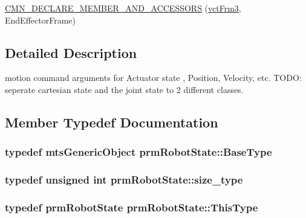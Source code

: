 {\bf }\par
\begin{DoxyCompactItemize}
\item 
\hyperlink{classprm_robot_state_a1c5c8244ace0caeb58700415253a892a}{C\+M\+N\+\_\+\+D\+E\+C\+L\+A\+R\+E\+\_\+\+M\+E\+M\+B\+E\+R\+\_\+\+A\+N\+D\+\_\+\+A\+C\+C\+E\+S\+S\+O\+R\+S} (\hyperlink{vct_transformation_types_8h_a81feda0a02c2d1bc26e5553f409fed20}{vct\+Frm3}, End\+Effector\+Frame)
\end{DoxyCompactItemize}



\subsection{Detailed Description}
motion command arguments for Actuator state , Position, Velocity, etc. T\+O\+D\+O\+: seperate cartesian state and the joint state to 2 different classes. 

\subsection{Member Typedef Documentation}
\hypertarget{classprm_robot_state_a602400b6ea7b54575290cc5207fc0167}{}
\subsubsection[{Base\+Type}]{\setlength{\rightskip}{0pt plus 5cm}typedef {\bf mts\+Generic\+Object} {\bf prm\+Robot\+State\+::\+Base\+Type}}\label{classprm_robot_state_a602400b6ea7b54575290cc5207fc0167}
\hypertarget{classprm_robot_state_a2cf2c739d5b3cdd3f9d44e2878183d90}{}
\subsubsection[{size\+\_\+type}]{\setlength{\rightskip}{0pt plus 5cm}typedef unsigned int {\bf prm\+Robot\+State\+::size\+\_\+type}}\label{classprm_robot_state_a2cf2c739d5b3cdd3f9d44e2878183d90}
\hypertarget{classprm_robot_state_ae29f0a2f1d1f44400da6e8191bc06475}{}
\subsubsection[{This\+Type}]{\setlength{\rightskip}{0pt plus 5cm}typedef {\bf prm\+Robot\+State} {\bf prm\+Robot\+State\+::\+This\+Type}}\label{classprm_robot_state_ae29f0a2f1d1f44400da6e8191bc06475}


